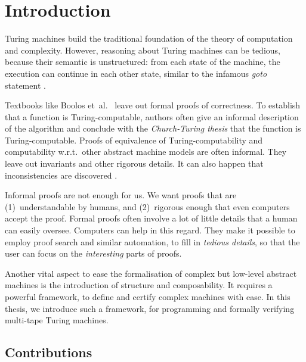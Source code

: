 \chapter{Introduction}
\label{chap:intro}

Turing machines build the traditional foundation of the theory of computation and complexity.  However, reasoning about Turing machines can be
tedious, because their semantic is unstructured: from each state of the machine, the execution can continue in each other state, similar to the
infamous \textit{goto} statement \cite{dijkstra2002go}.

Textbooks like Boolos et~al.~\cite{boolos2007computability} leave out formal proofs of correctness.  To establish that a function is
Turing-computable, authors often give an informal description of the algorithm and conclude with the \textit{Church-Turing thesis} that the function
is Turing-computable.  Proofs of equivalence of Turing-computability and computability w.r.t.\ other abstract machine models are often informal.  They
leave out invariants and other rigorous details.  It can also happen that inconsistencies are discovered \cite{Xu:2013:MTM:2529315.2529331}.

Informal proofs are not enough for us.  We want proofs that are (1)~understandable by humans, and (2)~rigorous enough that even computers accept the
proof.  Formal proofs often involve a lot of little details that a human can easily oversee.  Computers can help in this regard.  They make it
possible to employ proof search and similar automation, to fill in \textit{tedious details}, so that the user can focus on the \textit{interesting}
parts of proofs.

Another vital aspect to ease the formalisation of complex but low-level abstract machines is the introduction of structure and composability.  It
requires a powerful framework, to define and certify complex machines with ease.  In this thesis, we introduce such a framework, for programming and
formally verifying multi-tape Turing machines.


\section{Contributions}
\label{sec:contributions}

